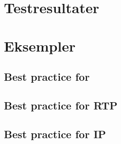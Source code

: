 \chapter{Testresultater}



\newpage



\chapter{Eksempler}
\section{Best practice for \des}




\section{Best practice for RTP}  

\section{Best practice for IP}  


